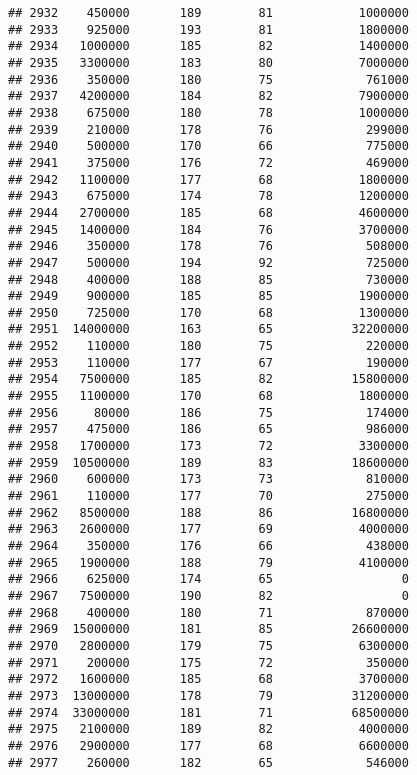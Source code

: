 \documentclass[
]{article}
\begin{document}
\begin{verbatim}
## 2932    450000       189        81            1000000
## 2933    925000       193        81            1800000
## 2934   1000000       185        82            1400000
## 2935   3300000       183        80            7000000
## 2936    350000       180        75             761000
## 2937   4200000       184        82            7900000
## 2938    675000       180        78            1000000
## 2939    210000       178        76             299000
## 2940    500000       170        66             775000
## 2941    375000       176        72             469000
## 2942   1100000       177        68            1800000
## 2943    675000       174        78            1200000
## 2944   2700000       185        68            4600000
## 2945   1400000       184        76            3700000
## 2946    350000       178        76             508000
## 2947    500000       194        92             725000
## 2948    400000       188        85             730000
## 2949    900000       185        85            1900000
## 2950    725000       170        68            1300000
## 2951  14000000       163        65           32200000
## 2952    110000       180        75             220000
## 2953    110000       177        67             190000
## 2954   7500000       185        82           15800000
## 2955   1100000       170        68            1800000
## 2956     80000       186        75             174000
## 2957    475000       186        65             986000
## 2958   1700000       173        72            3300000
## 2959  10500000       189        83           18600000
## 2960    600000       173        73             810000
## 2961    110000       177        70             275000
## 2962   8500000       188        86           16800000
## 2963   2600000       177        69            4000000
## 2964    350000       176        66             438000
## 2965   1900000       188        79            4100000
## 2966    625000       174        65                  0
## 2967   7500000       190        82                  0
## 2968    400000       180        71             870000
## 2969  15000000       181        85           26600000
## 2970   2800000       179        75            6300000
## 2971    200000       175        72             350000
## 2972   1600000       185        68            3700000
## 2973  13000000       178        79           31200000
## 2974  33000000       181        71           68500000
## 2975   2100000       189        82            4000000
## 2976   2900000       177        68            6600000
## 2977    260000       182        65             546000

\end{verbatim}
\end{document}
